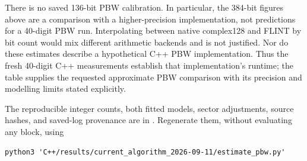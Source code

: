 There is no saved 136-bit PBW calibration.  In particular, the 384-bit figures
above are a comparison with a higher-precision implementation, not predictions
for a 40-digit PBW run.  Interpolating between native complex128 and FLINT by
bit count would mix different arithmetic backends and is not justified.
Nor do these estimates describe a hypothetical C++ PBW implementation.
Thus the fresh 40-digit C++ measurements establish that implementation's
runtime; the table supplies the requested approximate PBW comparison with
its precision and modelling limits stated explicitly.

\begin{samepage}
The reproducible integer counts, both fitted models, sector adjustments,
source hashes, and saved-log provenance are in
.
Regenerate them, without evaluating any block, using
\begin{verbatim}
python3 'C++/results/current_algorithm_2026-09-11/estimate_pbw.py'
\end{verbatim}
\end{samepage}
